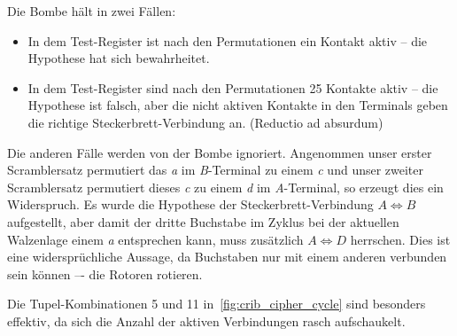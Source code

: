 Die Bombe hält in zwei Fällen:
\begin{itemize}
	\item In dem Test-Register ist nach den Permutationen ein Kontakt aktiv – die Hypothese hat sich bewahrheitet.
	\item In dem Test-Register sind nach den Permutationen 25 Kontakte aktiv – die Hypothese ist falsch, aber die nicht aktiven Kontakte in den Terminals geben die \glqq richtige\grqq{} Steckerbrett-Verbindung an. (Reductio ad absurdum)
\end{itemize}

Die anderen Fälle werden von der Bombe ignoriert.
Angenommen unser erster Scramblersatz permutiert das \emph{a} im \emph{B}-Terminal zu einem \emph{c} und unser zweiter Scramblersatz permutiert dieses \emph{c} zu einem \emph{d} im \emph{A}-Terminal, so erzeugt dies ein Widerspruch.
Es wurde die Hypothese der Steckerbrett-Verbindung $A \Leftrightarrow B$ aufgestellt, aber damit der dritte Buchstabe im Zyklus bei der aktuellen Walzenlage einem \emph{a} entsprechen kann, muss zusätzlich $A \Leftrightarrow D$ herrschen.
Dies ist eine widersprüchliche Aussage, da Buchstaben nur mit einem anderen verbunden sein können –- die Rotoren rotieren.

Die Tupel-Kombinationen 5 und 11 in~\cref{fig:crib_cipher_cycle} sind besonders effektiv, da sich die Anzahl der aktiven Verbindungen rasch \glqq aufschaukelt\grqq.


